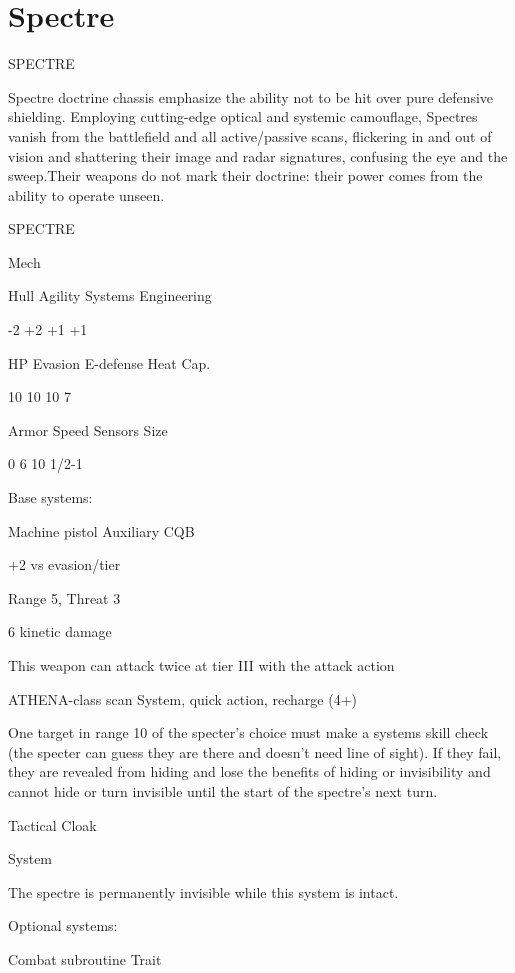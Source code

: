 \section{Spectre}

                                               SPECTRE

Spectre doctrine chassis emphasize the ability not to be hit over pure defensive shielding.
Employing cutting-edge optical and systemic camouflage, Spectres vanish from the battlefield
and all active/passive scans, flickering in and out of vision and shattering their image and radar
signatures, confusing the eye and the sweep.Their weapons do not mark their doctrine: their
power comes from the ability to operate unseen.


 SPECTRE

 Mech

 Hull       Agility      Systems       Engineering

 -2         +2           +1            +1

 HP         Evasion      E-defense     Heat Cap.

 10         10           10            7

 Armor      Speed        Sensors       Size

 0          6            10            1/2-1

Base systems:

Machine pistol
Auxiliary CQB

+2 vs evasion/tier

Range 5, Threat 3

6 kinetic damage

This weapon can attack twice at tier III with the attack action


ATHENA-class scan
System, quick action, recharge (4+)

One target in range 10 of the specter’s choice must make a systems skill check (the specter can
guess they are there and doesn’t need line of sight). If they fail, they are revealed from hiding and
lose the benefits of hiding or invisibility and cannot hide or turn invisible until the start of the
spectre’s next turn.


Tactical Cloak

System

The spectre is permanently invisible while this system is intact.


Optional systems:




Combat subroutine
Trait

